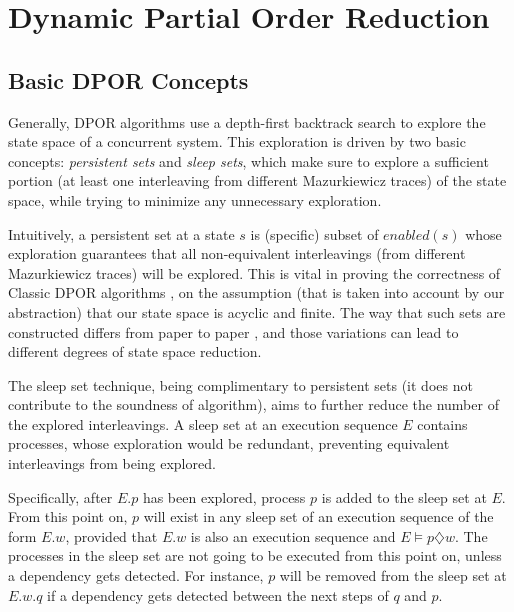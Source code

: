 \chapter{Dynamic Partial Order Reduction}
\label{dpor}

\section{Basic DPOR Concepts}

Generally, DPOR algorithms use a depth-first backtrack search to explore the state space of a concurrent system.
This exploration is driven by two basic concepts: \textit{persistent sets} and \textit{sleep sets}, which make sure to explore a
sufficient portion (at least one interleaving from different Mazurkiewicz traces) of the state space,
while trying to minimize any unnecessary exploration.

Intuitively, a persistent set at a state $s$ is (specific) subset of $enabled(s)$ whose exploration guarantees that all
non-equivalent interleavings (from different Mazurkiewicz traces) will be explored. This is vital in proving the correctness of Classic 
DPOR algorithms \cite{FlanaganDPOR}, on the assumption 
(that is taken into account by our abstraction) that our state space is acyclic and finite.
The way that such sets are constructed differs from paper to paper \cite{FlanaganDPOR, Lei:2006:RTC:1248722.1248743, 10.1007/3-540-53863-1_36},
and those variations can lead to different degrees of state space reduction.

The sleep set technique, being complimentary to persistent sets (it does not contribute to the soundness of algorithm),
aims to further reduce the number of the explored interleavings.
A sleep set at an execution sequence $E$ contains processes, whose exploration would be redundant,
preventing equivalent interleavings from being explored.

Specifically, after $E.p$ has been explored, process $p$ is added to the sleep set
at $E$. From this point on, $p$ will exist in any sleep set of an execution sequence
of the form $E.w$, provided that $E.w$ is also an execution sequence and $E\models p \diamondsuit w$. 
The processes in the sleep set are not going to be executed from this point on, unless a dependency gets detected. 
For instance, $p$ will be removed from the sleep set at $E.w.q$ if a dependency gets detected between the
next steps of $q$ and $p$. 


